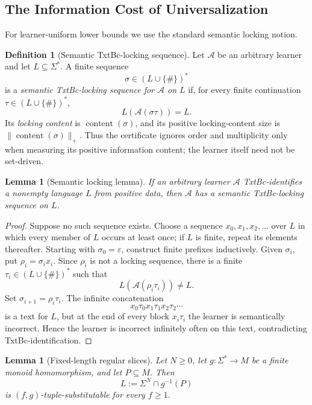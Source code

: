\documentclass[11pt,a4paper]{article}
\numberwithin{equation}{section}
\theoremstyle{plain}
\newtheorem{lemma}[theorem]{Lemma}
\theoremstyle{definition}
\newtheorem{definition}[theorem]{Definition}
\theoremstyle{remark}
\newcommand{\eps}{\varepsilon}
\begin{document}
\subsection{The Information Cost of Universalization}
\label{subsec:uniform-observation-bound}

For learner-uniform lower bounds we use the standard semantic locking notion.
\begin{definition}[Semantic TxtBc-locking sequence]
\label{def:semantic-locking-sequence}
Let \(\mathcal A\) be an arbitrary learner and let \(L\subseteq\Sigma^*\).
A finite sequence
\[
  \sigma\in(L\cup\{\#\})^*
\]
is a \emph{semantic TxtBc-locking sequence for \(\mathcal A\) on \(L\)} if,
for every finite continuation \(\tau\in(L\cup\{\#\})^*\),
\[
  L(\mathcal A(\sigma\tau))=L.
\]
Its \emph{locking content} is \(\operatorname{content}(\sigma)\), and its
positive locking-content size is
\(\|\operatorname{content}(\sigma)\|_+\).
Thus the certificate ignores order and multiplicity only when measuring its
positive information content; the learner itself need not be set-driven.
\end{definition}

\begin{lemma}[Semantic locking lemma]
\label{lem:semantic-locking-exists}
If an arbitrary learner \(\mathcal A\) TxtBc-identifies a nonempty language
\(L\) from positive data, then \(\mathcal A\) has a semantic TxtBc-locking
sequence on \(L\).
\end{lemma}

\begin{proof}
Suppose no such sequence exists.  Choose a sequence
\(x_0,x_1,x_2,\ldots\) over \(L\) in which every member of \(L\) occurs at
least once; if \(L\) is finite, repeat its elements thereafter.  Starting with
\(\sigma_0=\eps\), construct finite prefixes inductively.  Given
\(\sigma_i\), put \(\rho_i=\sigma_i x_i\).  Since \(\rho_i\) is not a
locking sequence, there is a finite
\(\tau_i\in(L\cup\{\#\})^*\) such that
\[
  L(\mathcal A(\rho_i\tau_i))\ne L.
\]
Set \(\sigma_{i+1}=\rho_i\tau_i\).  The infinite concatenation
\[
  x_0\tau_0x_1\tau_1x_2\tau_2\cdots
\]
is a text for \(L\), but at the end of every block \(x_i\tau_i\) the
learner is semantically incorrect.  Hence the learner is incorrect infinitely
often on this text, contradicting TxtBc-identification.
\end{proof}


\begin{lemma}[Fixed-length regular slices]
\label{lem:fixed-length-regular-slices}
Let \(N\ge0\), let \(g:\Sigma^*\to M\) be a finite monoid homomorphism, and
let \(P\subseteq M\).  Then
\[
  L:=\Sigma^N\cap g^{-1}(P)
\]
is \((f,g)\)-tuple-substitutable for every \(f\ge1\).
\end{lemma}
\end{document}
